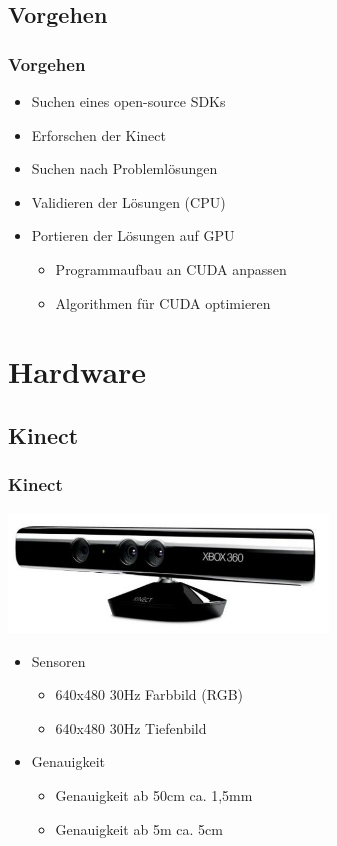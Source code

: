 \documentclass{beamer}
\begin{document}
\subsection{Vorgehen}

\begin{frame}
\frametitle{Vorgehen}

\begin{itemize}
	\item Suchen eines open-source SDKs
	\item Erforschen der Kinect
	\item Suchen nach Problemlösungen
	\item Validieren der Lösungen (CPU)
	\item Portieren der Lösungen auf GPU
	\begin{itemize}
		\item Programmaufbau an CUDA anpassen 
		\item Algorithmen für CUDA optimieren
	\end{itemize}
	
\end{itemize}
\end{frame}

\section{Hardware}

\subsection{Kinect}
\begin{frame}
\frametitle{Kinect}

\hspace*{1.8cm}\includegraphics[width=8.5cm]{kin.jpg}

\begin{itemize}
	\item Sensoren
	\begin{itemize}
		\item 640x480 \@ 30Hz Farbbild (RGB)
		\item 640x480 \@ 30Hz Tiefenbild
	\end{itemize}
	\item Genauigkeit
	\begin{itemize}
		\item Genauigkeit ab 50cm ca. 1,5mm
		\item Genauigkeit ab 5m ca. 5cm
	\end{itemize}
\end{itemize}
\end{frame}
\end{document}
